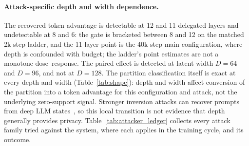 \documentclass[11pt]{article}
\begin{document}
\paragraph{Attack-specific depth and width dependence.}
The recovered token advantage is detectable at 12 and 11 delegated layers and
undetectable at 8 and 6: the gate is bracketed between 8 and 12 on the matched
2k-step ladder, and the 11-layer point is the 40k-step main configuration, where
depth is confounded with budget; the ladder's point estimates are not a
monotone dose--response. The paired effect is detected at latent width $D{=}64$ and $D{=}96$, and not
at $D{=}128$. The
partition classification itself is exact at every
depth and width (Table~\ref{tab:shape}): depth and width affect conversion of
the partition into a token advantage for this configuration and attack, not the
underlying zero-support signal. Stronger inversion attacks can recover prompts
from deep LLM states~\cite{dong2025depth}, so this local transition is not
evidence that depth generally provides privacy.
Table~\ref{tab:attacker_ledger} collects every attack family tried against the
system, where each applies in the training cycle, and its outcome.
\end{document}
